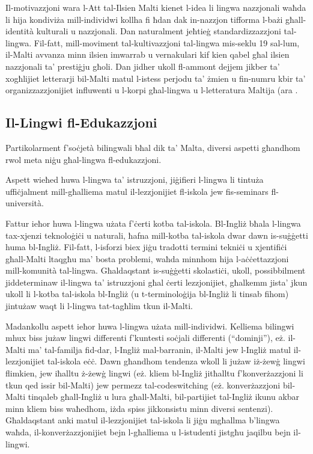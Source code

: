 \documentclass[]{../../metanetpaper}
\begin{document}
\begin{multicols}{2}
Il-motivazzjoni wara l-Att tal-Ilsien Malti kienet l-idea li lingwa nazzjonali waħda li hija kondiviża mill-individwi kollha fi ħdan dak in-nazzjon tifforma l-bażi għall-identità kulturali u nazzjonali. Dan naturalment jeħtieġ standardizzazzjoni tal-lingwa. Fil-fatt, mill-moviment tal-kultivazzjoni tal-lingwa mis-seklu 19 sal-lum, il-Malti avvanza minn ilsien imwarrab u vernakulari kif kien qabel għal ilsien nazzjonali ta’ prestiġju għoli. Dan jidher ukoll fl-ammont dejjem jikber ta’ xogħlijiet letterarji bil-Malti matul l-istess perjodu ta’ żmien u fin-numru kbir ta’ organizzazzjonijiet influwenti u l-korpi għal-lingwa u l-letteratura Maltija (ara \cite{Fabri:2011a}.

\subsection{Il-Lingwi fl-Edukazzjoni}

Partikolarment f'soċjetà bilingwali bħal dik ta’ Malta, diversi aspetti għandhom rwol meta niġu għal-lingwa fl-edukazzjoni.

Aspett wieħed huwa l-lingwa ta’ istruzzjoni, jiġifieri l-lingwa li tintuża uffiċjalment mill-għalliema matul il-lezzjonijiet fl-iskola jew fis-seminars fl-università.

Fattur ieħor huwa l-lingwa użata f'ċerti kotba tal-iskola. Bl-Ingliż bħala l-lingwa tax-xjenzi teknoloġiċi u naturali, ħafna mill-kotba tal-iskola dwar dawn is-suġġetti huma bl-Ingliż. Fil-fatt, l-isforzi biex jiġu tradotti termini tekniċi u xjentifiċi għall-Malti ltaqgħu ma’  bosta problemi, waħda minnhom hija l-aċċettazzjoni mill-komunità tal-lingwa. Għaldaqstant is-suġġetti skolastiċi, ukoll, possibbilment jiddeterminaw il-lingwa ta’ istruzzjoni għal ċerti lezzjonijiet, għalkemm jista’ jkun ukoll li l-kotba tal-iskola bl-Ingliż (u t-terminoloġija bl-Ingliż li tinsab fihom) jintużaw waqt li l-lingwa tat-tagħlim tkun il-Malti.

Madankollu aspett ieħor huwa l-lingwa użata mill-individwi. Kelliema bilingwi mhux biss jużaw lingwi differenti f'kuntesti soċjali differenti (``dominji''), eż. il-Malti ma’ tal-familja fid-dar, l-Ingliż mal-barranin, il-Malti jew l-Ingliż matul il-lezzjonijiet tal-iskola eċċ. Dawn għandhom tendenza wkoll li jużaw iż-żewġ lingwi flimkien, jew iħalltu ż-żewġ lingwi (eż. kliem bl-Ingliż jitħalltu f’konverżazzjoni li tkun qed issir bil-Malti) jew permezz tal-codeswitching (eż. konverżazzjoni bil-Malti tinqaleb għall-Ingliż u lura għall-Malti, bil-partijiet tal-Ingliż ikunu akbar minn kliem biss waħedhom, iżda spiss jikkonsistu minn diversi sentenzi). Għaldaqstant anki matul il-lezzjonijiet tal-iskola li jiġu mgħallma b’lingwa waħda, il-konverżazzjonijiet bejn l-għalliema u l-istudenti jistgħu jaqilbu bejn il-lingwi\cite{Camilleri:1995}.


\end{multicols}
\end{document}

